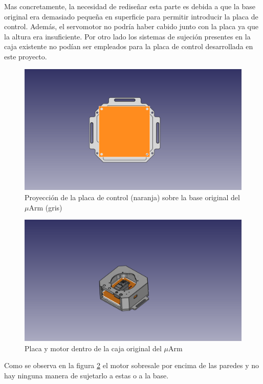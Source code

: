  Mas concretamente, la necesidad de rediseñar esta parte es debida a que la base original era demasiado pequeña en superficie para permitir introducir la placa de control. Además, el servomotor no podría haber cabido junto con la placa ya que la altura era insuficiente. Por otro lado los sistemas de sujeción presentes en la caja existente no podían ser empleados para la placa de control desarrollada en este proyecto.
 
 \begin{figure}[H]
    \centering
    \includegraphics[width=.9\linewidth]{pictures/PlacaYBase.png}
    \caption{Proyección de la placa de control (naranja) sobre la base original del $\mu$Arm (gris)}
    \label{fig:placa_y_base_antiguas}
\end{figure}


 \begin{figure}[H]
    \centering
    \includegraphics[width=.9\linewidth]{pictures/PlacaMotorYParedes1.png}
    \caption{Placa y motor dentro de la caja original del $\mu$Arm}
    \label{fig:placa_motor_y_paredes1}
\end{figure}

Como se observa en la figura \ref{fig:placa_motor_y_paredes1} el motor sobresale por encima de las paredes y no hay ninguna manera de sujetarlo a estas o a la base.


